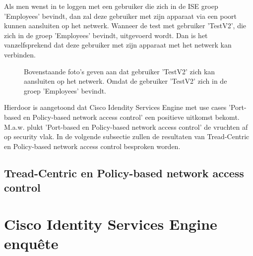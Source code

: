 Als men wenst in te loggen met een gebruiker die zich in de ISE groep 'Employees' bevindt, dan zal deze gebruiker met zijn apparaat via een poort kunnen aansluiten op het netwerk. 
\newline
\newline
Wanneer de test met gebruiker 'TestV2', die zich in de groep 'Employees' bevindt, uitgevoerd wordt. Dan is het vanzelfsprekend dat deze gebruiker met zijn apparaat met het netwerk kan verbinden.

\begin{figure}[H]
	\centering
	\qquad
	\newline
	\qquad
	\caption{Bovenstaande foto's geven aan dat gebruiker 'TestV2' zich kan aansluiten op het netwerk. Omdat de gebruiker 'TestV2' zich in de groep 'Employees' bevindt.}%
	\label{fig:Test_gebruiker}%
\end{figure}

Hierdoor is aangetoond dat Cisco Idendity Services Engine met use cases 'Port-based en Policy-based network access control' een positieve uitkomst bekomt. M.a.w. plukt 'Port-based en Policy-based network access control' de vruchten af op security vlak. In de volgende subsectie zullen de resultaten van Tread-Centric en Policy-based network access control besproken worden.


\subsection{Tread-Centric en Policy-based network access control}
\section{Cisco Identity Services Engine enquête}


